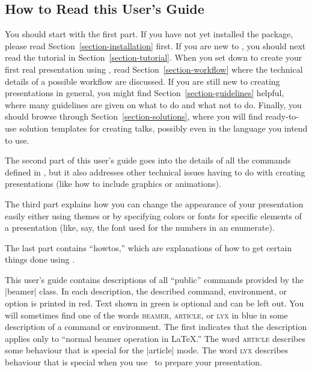 \subsection{How to Read this User's Guide}

You should start with the first part. If you have not yet installed
the package, please read Section~\ref{section-installation} first. If 
you are new to \beamer, you should next read the tutorial in
Section~\ref{section-tutorial}. When you set down to create your first
real presentation using \beamer, read Section~\ref{section-workflow}
where the technical details of a possible workflow are
discussed. If you are still new to creating presentations in general, you
might find Section~\ref{section-guidelines} helpful, where many
guidelines are given on what to do and what not to do. Finally, you
should browse through Section~\ref{section-solutions}, where you will
find ready-to-use solution templates for creating talks, possibly even
in the language you intend to use.

The second part of this user's guide goes into the details of all the
commands defined in \beamer, but it also addresses  other technical
issues having to do with creating presentations (like how to include
graphics or animations).

The third part explains how you can change the appearance of your
presentation easily either using themes or by specifying colors or
fonts for specific elements of a presentation (like, say, the font
used for the numbers in an enumerate). 

The last part contains ``howtos,'' which are explanations of how to
get certain things done using \beamer.

\medskip
\noindent
This user's guide contains descriptions of all ``public''
commands provided by the |beamer| class. In each description, the
described command, environment, or option is printed  in red. Text
shown in green is optional and can be left out. 
You will sometimes find one of the words \textsc{beamer},
\textsc{article}, or \textsc{lyx} in blue in some description of a
command or environment. The first indicates that the description
applies only to ``normal beamer operation in \LaTeX.'' The word
\textsc{article} describes some behaviour that is special for the
|article| mode. The word \textsc{lyx} describes behaviour that is
special when you use \LyX\ to prepare your presentation.  





